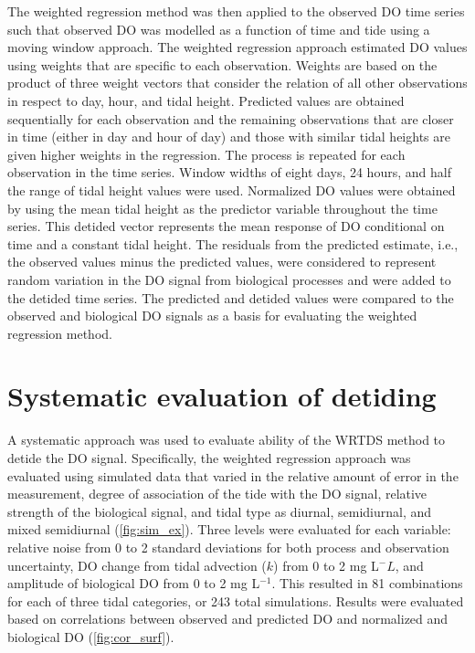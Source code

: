 \documentclass{article}\usepackage[]{graphicx}\usepackage[]{color}
\begin{document}
The weighted regression method was then applied to the observed DO time series such that observed DO was modelled as a function of time and tide using a moving window approach.  The weighted regression approach estimated DO values using weights that are specific to each observation.  Weights are based on the product of three weight vectors that consider the relation of all other observations in respect to day, hour, and tidal height.  Predicted values are obtained sequentially for each observation and the remaining observations that are closer in time (either in day and hour of day) and those with similar tidal heights are given higher weights in the regression.  The process is repeated for each observation in the time series. Window widths of eight days, 24 hours, and half the range of tidal height values were used.  Normalized DO values were obtained by using the mean tidal height as the predictor variable throughout the time series.  This detided vector represents the mean response of DO conditional on time and a constant tidal height.  The residuals from the predicted estimate, i.e., the observed values minus the predicted values, were considered to represent random variation in the DO signal from biological processes and were added to the detided time series.  
The predicted and detided values were compared to the observed and biological DO signals as a basis for evaluating the weighted regression method.

\section{Systematic evaluation of detiding}

A systematic approach was used to evaluate ability of the WRTDS method to detide the DO signal.  Specifically, the weighted regression approach was evaluated using simulated data that varied in the relative amount of error in the measurement, degree of association of the tide with the DO signal, relative strength of the biological signal, and tidal type as diurnal, semidiurnal, and mixed semidiurnal (\cref{fig:sim_ex}).  Three levels were evaluated for each variable: relative noise from 0 to 2 standard deviations for both process and observation uncertainty, DO change from tidal advection ($k$) from 0 to 2 mg L$^-L$, and amplitude of biological DO from 0 to 2 mg L$^{-1}$.  This resulted in 81 combinations for each of three tidal categories, or 243 total simulations.  Results were evaluated based on correlations between observed and predicted DO and normalized and biological DO (\cref{fig:cor_surf}).  
\end{document}
